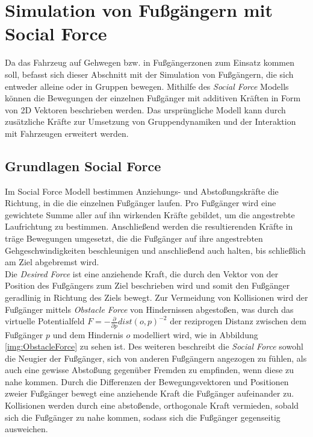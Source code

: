 
\section{Simulation von Fußgängern mit Social Force}\label{sec:SocialForce}

Da das Fahrzeug auf Gehwegen bzw. in Fußgängerzonen zum Einsatz kommen soll, befasst
sich dieser Abschnitt mit der Simulation von Fußgängern, die sich entweder
alleine oder in Gruppen bewegen. Mithilfe des \emph{Social Force} Modells
\cite{helbig1995socialforce} können die Bewegungen
der einzelnen Fußgänger mit additiven Kräften in Form von 2D Vektoren beschrieben
werden. Das ursprüngliche Modell kann durch zusätzliche Kräfte zur Umsetzung
von Gruppendynamiken \cite{moussaid2010groupssf} und der Interaktion mit Fahrzeugen
\cite{machines11020268} erweitert werden.

\subsection{Grundlagen Social Force}
Im Social Force Modell bestimmen Anziehungs- und Abstoßungskräfte die Richtung,
in die die einzelnen Fußgänger laufen. Pro Fußgänger wird eine gewichtete Summe
aller auf ihn wirkenden Kräfte gebildet, um die angestrebte Laufrichtung zu bestimmen.
Anschließend werden die resultierenden Kräfte in träge Bewegungen umgesetzt, die
die Fußgänger auf ihre angestrebten Gehgeschwindigkeiten beschleunigen und anschließend
auch halten, bis schließlich am Ziel abgebremst wird.\\

Die \emph{Desired Force} ist eine anziehende Kraft, die durch den Vektor von der
Position des Fußgängers zum Ziel beschrieben wird und somit den Fußgänger geradlinig
in Richtung des Ziels bewegt. Zur Vermeidung von Kollisionen wird der Fußgänger
mittels \emph{Obstacle Force} von Hindernissen abgestoßen, was durch das virtuelle
Potentialfeld $F = - \frac{\partial}{\partial p} dist(o, p)^{-2}$ der reziprogen Distanz
zwischen dem Fußgänger $p$ und dem Hindernis $o$ modelliert wird, wie in Abbildung
\ref{img:ObstacleForce} zu sehen ist.
Des weiteren beschreibt die \emph{Social Force} sowohl die Neugier der Fußgänger,
sich von anderen Fußgängern angezogen zu fühlen, als auch eine gewisse Abstoßung
gegenüber Fremden zu empfinden, wenn diese zu nahe kommen.
Durch die Differenzen der Bewegungsvektoren und Positionen zweier Fußgänger bewegt
eine anziehende Kraft die Fußgänger aufeinander zu. Kollisionen werden durch eine
abstoßende, orthogonale Kraft vermieden, sobald sich die Fußgänger zu nahe kommen,
sodass sich die Fußgänger gegenseitig ausweichen.\\

